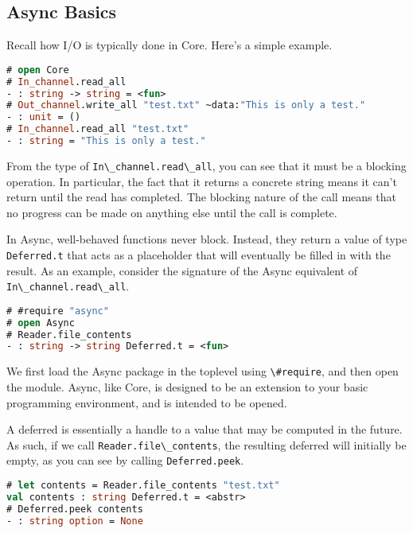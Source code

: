 \hypertarget{async-basics}{%
\subsection{Async Basics}\label{async-basics}}

Recall how I/O is typically done in Core. Here's a simple example.

\begin{lstlisting}[language=Caml]
# open Core
# In_channel.read_all
- : string -> string = <fun>
# Out_channel.write_all "test.txt" ~data:"This is only a test."
- : unit = ()
# In_channel.read_all "test.txt"
- : string = "This is only a test."
\end{lstlisting}

From the type of \passthrough{\lstinline!In\_channel.read\_all!}, you
can see that it must be a blocking operation. In particular, the fact
that it returns a concrete string means it can't return until the read
has completed. The blocking nature of the call means that no progress
can be made on anything else until the call is complete.

In Async, well-behaved functions never block. Instead, they return a
value of type \passthrough{\lstinline!Deferred.t!} that acts as a
placeholder that will eventually be filled in with the result. As an
example, consider the signature of the Async equivalent of
\passthrough{\lstinline!In\_channel.read\_all!}. 

\begin{lstlisting}[language=Caml]
# #require "async"
# open Async
# Reader.file_contents
- : string -> string Deferred.t = <fun>
\end{lstlisting}

We first load the Async package in the toplevel using
\passthrough{\lstinline!\#require!}, and then open the module. Async,
like Core, is designed to be an extension to your basic programming
environment, and is intended to be opened.

A deferred is essentially a handle to a value that may be computed in
the future. As such, if we call
\passthrough{\lstinline!Reader.file\_contents!}, the resulting deferred
will initially be empty, as you can see by calling
\passthrough{\lstinline!Deferred.peek!}. 

\begin{lstlisting}[language=Caml]
# let contents = Reader.file_contents "test.txt"
val contents : string Deferred.t = <abstr>
# Deferred.peek contents
- : string option = None
\end{lstlisting}

